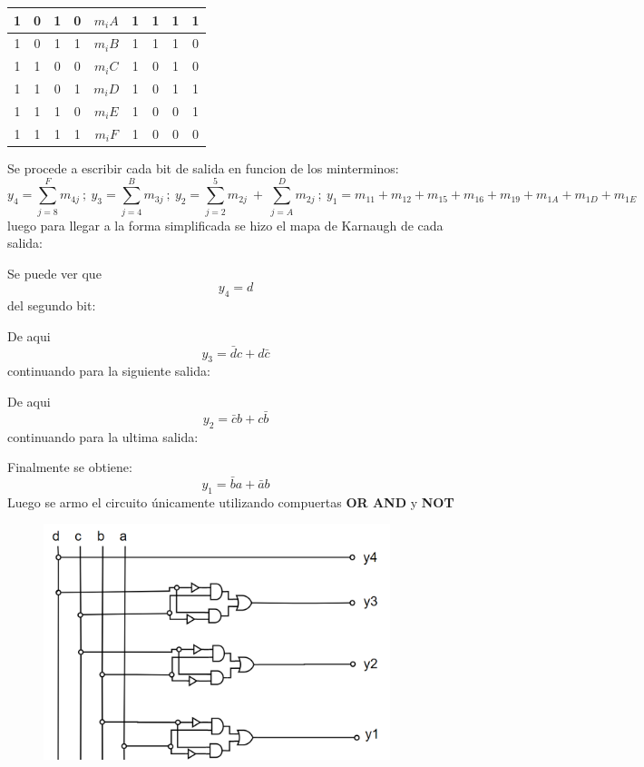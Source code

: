 \documentclass[a4paper]{article}
\begin{document}
\begin{table}[H]
\begin{tabular}{|c|c|c|c|c|c|c|c|c|}
1              & 0              & 1              & 0              & \textbf{$m_iA$}   & 1              & 1              & 1              & 1              \\ \hline
1              & 0              & 1              & 1              & \textbf{$m_iB$}   & 1              & 1              & 1              & 0              \\ \hline
1              & 1              & 0              & 0              & \textbf{$m_iC$}   & 1              & 0              & 1              & 0              \\ \hline
1              & 1              & 0              & 1              & \textbf{$m_iD$}   & 1              & 0              & 1              & 1              \\ \hline
1              & 1              & 1              & 0              & \textbf{$m_iE$}   & 1              & 0              & 0              & 1              \\ \hline
1              & 1              & 1              & 1              & \textbf{$m_iF$}   & 1              & 0              & 0              & 0              \\ \hline
\end{tabular}
\end{table}

Se procede a escribir cada bit de salida en funcion de los minterminos:
\[
	y_4 = \sum_{j=8}^{F} m_{4j}  \  ; \ y_3 = \sum_{j=4}^{B} m_{3j}\  ; \ y_2 = \sum_{j=2}^{5} m_{2j} \ + \  \sum_{j=A}^{D} m_{2j}  \  ; \  y_1=m_{11}+m_{12}+m_{15}+m_{16}+m_{19}+m_{1A}+m_{1D}+m_{1E} 
\]
luego para llegar a la forma simplificada se hizo el mapa de Karnaugh de cada salida:

Se puede ver que $$y_4 = d$$
del segundo bit:

De aqui $$y_3 = \bar{d}c+d\bar{c}$$
continuando para la siguiente salida:

De aqui $$y_2 = \bar{c}b+c\bar{b}$$
continuando para la ultima salida:

Finalmente se obtiene: $$y_1 = \bar{b}a+\bar{a}b$$
Luego se armo el circuito únicamente utilizando compuertas \textbf{OR AND } y \textbf{NOT}

\begin{figure}[H]
	\centering
	\includegraphics[width=0.9\textwidth]{Circuito3.PNG}
	\label{fig:circ3}
\end{figure}
\end{document}
